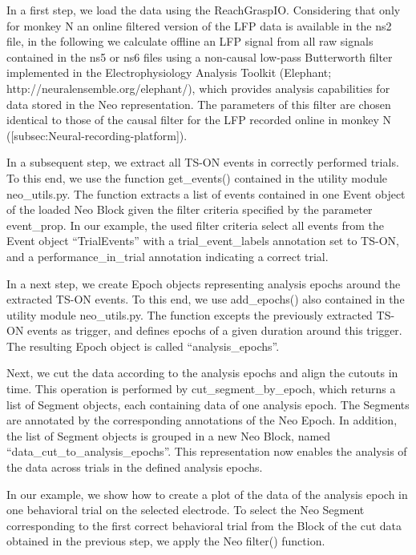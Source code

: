 {In a first step, we load the data using the ReachGraspIO. Considering that only for monkey N an online filtered version of the LFP data is available in the ns2 file, in the following we calculate offline an LFP signal from all raw signals contained in the ns5 or ns6 files using a non-causal low-pass Butterworth filter implemented in the Electrophysiology Analysis Toolkit (Elephant; http://neuralensemble.org/elephant/), which provides analysis capabilities for data stored in the Neo representation. The parameters of this filter are chosen identical to those of the causal filter for the LFP recorded online in monkey N ([subsec:Neural-recording-platform]).

In a subsequent step, we extract all TS-ON events in correctly performed trials. To this end, we use the function get\_events() contained in the utility module neo\_utils.py. The function extracts a list of events contained in one Event object of the loaded Neo Block given the filter criteria specified by the parameter event\_prop. In our example, the used filter criteria select all events from the Event object “TrialEvents” with a trial\_event\_labels annotation set to TS-ON, and a performance\_in\_trial annotation indicating a correct trial.

In a next step, we create Epoch objects representing analysis epochs around the extracted TS-ON events. To this end, we use add\_epochs() also contained in the utility module neo\_utils.py. The function excepts the previously extracted TS-ON events as trigger, and defines epochs of a given duration around this trigger. The resulting Epoch object is called “analysis\_epochs”. 

Next, we cut the data according to the analysis epochs and align the cutouts in time. This operation is performed by cut\_segment\_by\_epoch, which returns a list of Segment objects, each containing data of one analysis epoch. The Segments are annotated by the corresponding annotations of the Neo Epoch. In addition, the list of Segment objects is grouped in a new Neo Block, named “data\_cut\_to\_analysis\_epochs”. This representation now enables the analysis of the data across trials in the defined analysis epochs. 

In our example, we show how to create a plot of the data of the analysis epoch in one behavioral trial on the selected electrode. To select the Neo Segment corresponding to the first correct behavioral trial from the Block of the cut data obtained in the previous step, we apply the Neo filter() function. 

}
